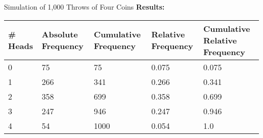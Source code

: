 \documentclass[handout]{beamer} %
\begin{document}
\begin{frame}{Simulation of 1,000 Throws of Four Coins}
    \textbf{Results:}

    \vspace{1em}

{\small \centering
\begin{tabular}{|p{}|p{}|p{}|
                    p{}|p{}|}
    \hline
    \# Heads & Absolute Frequency & Cumulative Frequency & Relative Frequency & Cumulative Relative Frequency \\
    \hline
    0 & 75 & 75 & 0.075 & 0.075 \\
    1 & 266 & 341 & 0.266 & 0.341 \\
    2 & 358 & 699 & 0.358 & 0.699 \\
    3 & 247 & 946 & 0.247 & 0.946 \\
    4 & 54 & 1000 & 0.054 & 1.0 \\
    \hline
\end{tabular}
\par}

\end{frame}
\end{document}
